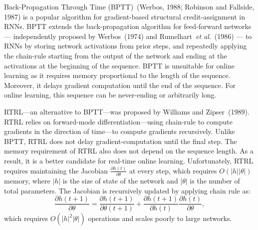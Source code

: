 \documentclass{article}
\newcommand{\etal}{\textit{et al}.}
\begin{document}
Back-Propagation Through Time (BPTT)~(Werbos, 1988; Robinson and Fallside, 1987) is a popular algorithm for gradient-based structural credit-assignment in RNNs. BPTT extends the back-propagation algorithm for feed-forward networks --- independently proposed by Werbos~(1974) and Rumelhart~\etal~(1986) --- to RNNs by storing network activations from prior steps, and repeatedly applying the chain-rule starting from the output of the network and ending at the activations at the beginning of the sequence. BPTT is unsuitable for online learning as it requires memory proportional to the length of the sequence. Moreover, it delays gradient computation until the end of the sequence. For online learning, this sequence can be never-ending or arbitrarily long. 







RTRL---an alternative to BPTT---was proposed by Williams and Zipser~(1989). RTRL relies on forward-mode differentiation---using chain-rule to compute gradients in the direction of time---to compute gradients recursively. Unlike BPTT, RTRL does not delay gradient-computation until the final step. The memory requirement of RTRL also does not depend on the sequence length. As a result, it is a better candidate for real-time online learning. Unfortunately, RTRL requires maintaining the Jacobian $\frac{\partial h(t)}{\partial \theta}$ at every step, which requires $O(|h||\theta|)$ memory, where $|h|$ is the size of state of the network and $|\theta|$ is the number of total parameters. The Jacobian is recursively updated by applying chain rule as:  
$$\frac{\partial h(t+1)}{\partial \theta} =\frac{\partial h(t+1)}{\partial \theta(t+1)} +  \frac{\partial h(t+1)}{\partial h(t)}\frac{\partial h(t)}{\partial \theta}, $$ 
which requires  $O(|h|^2|\theta|)$ operations and scales poorly to large networks.

 
\end{document}
